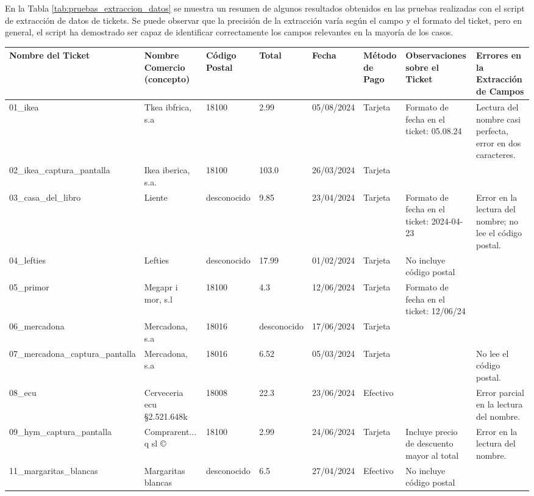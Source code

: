 En la Tabla \ref{tab:pruebas_extraccion_datos} se muestra un resumen de algunos resultados obtenidos en las pruebas realizadas con el script de extracción de datos de tickets. Se puede observar que la precisión de la extracción varía según el campo y el formato del ticket, pero en general, el script ha demostrado ser capaz de identificar correctamente los campos relevantes en la mayoría de los casos.

\begin{landscape}
    \begin{table}[]
    \begin{tabular}{|l|l|l|l|l|l|l|l|}
    \hline
    \textbf{Nombre del Ticket} & \textbf{Nombre Comercio (concepto)} & \textbf{Código Postal} & \textbf{Total} & \textbf{Fecha} & \textbf{Método de Pago} & \textbf{Observaciones sobre el Ticket} & \textbf{Errores en la Extracción de Campos} \\ \hline
    01\_ikea & Tkea ibfrica, s.a & 18100 & 2.99 & 05/08/2024 & Tarjeta & Formato de fecha en el ticket: 05.08.24 & Lectura del nombre casi perfecta, error en dos caracteres. \\ \hline
    02\_ikea\_captura\_pantalla & Ikea iberica, s.a. & 18100 & 103.0 & 26/03/2024 & Tarjeta &  &  \\ \hline
    03\_casa\_del\_libro & Liente & desconocido & 9.85 & 23/04/2024 & Tarjeta & Formato de fecha en el ticket: 2024-04-23 & Error en la lectura del nombre; no lee el código postal. \\ \hline
    04\_lefties & Lefties & desconocido & 17.99 & 01/02/2024 & Tarjeta & No incluye código postal &  \\ \hline
    05\_primor & Megapr i mor, s.l & 18100 & 4.3 & 12/06/2024 & Tarjeta & Formato de fecha en el ticket: 12/06/24 &  \\ \hline
    06\_mercadona & Mercadona, s.a & 18016 & desconocido & 17/06/2024 & Tarjeta &  &  \\ \hline
    07\_mercadona\_captura\_pantalla & Mercadona, s.a & 18016 & 6.52 & 05/03/2024 & Tarjeta &  & No lee el código postal. \\ \hline
    08\_ecu & Cerveceria ecu §2.521.648k & 18008 & 22.3 & 23/06/2024 & Efectivo &  & Error parcial en la lectura del nombre. \\ \hline
    09\_hym\_captura\_pantalla & Comprarent... q sl © & 18100 & 2.99 & 24/06/2024 & Tarjeta & Incluye precio de descuento mayor al total & Error en la lectura del nombre. \\ \hline
    11\_margaritas\_blancas & Margaritas blancas & desconocido & 6.5 & 27/04/2024 & Efectivo & No incluye código postal &  \\ \hline

\end{tabular}
\end{table}
\end{landscape}
